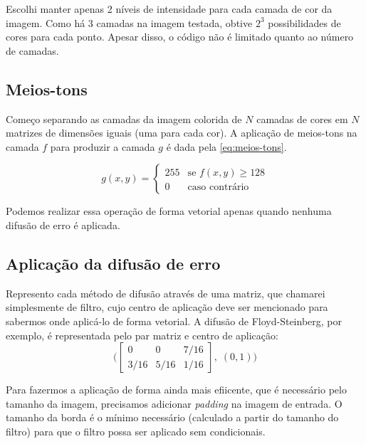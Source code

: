 \documentclass[brazilian,a4paper,twocolumn]{article}
\begin{document}
    Escolhi manter apenas 2 níveis de intensidade para cada camada de cor da imagem. Como há 3 camadas na imagem testada, obtive $ 2^3 $ possibilidades de cores para cada ponto. Apesar disso, o código não é limitado quanto ao número de camadas.

    \subsection{Meios-tons}

        Começo separando as camadas da imagem colorida de $N$ camadas de cores em $N$ matrizes de dimensões iguais (uma para cada cor). A aplicação de meios-tons na camada $f$ para produzir a camada $g$ é dada pela \cref{eq:meios-tons}.

        \begin{equation}
        \label{eq:meios-tons}
            g(x, y) =
            \begin{cases}
                255     & \text{se $f(x, y) \geq 128$} \\
                0       & \text{caso contrário}
            \end{cases}
        \end{equation}

        Podemos realizar essa operação de forma vetorial apenas quando nenhuma difusão de erro é aplicada.

    \subsection{Aplicação da difusão de erro}

        Represento cada método de difusão através de uma matriz, que chamarei simplesmente de filtro, cujo centro de aplicação deve ser mencionado para sabermos onde aplicá-lo de forma vetorial. A difusão de Floyd-Steinberg, por exemplo, é representada pelo par matriz e centro de aplicação:
        \begin{equation*}
            \Bigg(
            \begin{bmatrix}
                0 & 0 & 7/16 \\
                3/16 & 5/16 & 1/16
            \end{bmatrix}
            ,\; (0, 1)
            \Bigg)
        \end{equation*}

        Para fazermos a aplicação de forma ainda mais efiicente, que é necessário pelo tamanho da imagem, precisamos adicionar \textit{padding} na imagem de entrada. O tamanho da borda é o mínimo necessário (calculado a partir do tamanho do filtro) para que o filtro possa ser aplicado sem condicionais.
\end{document}

